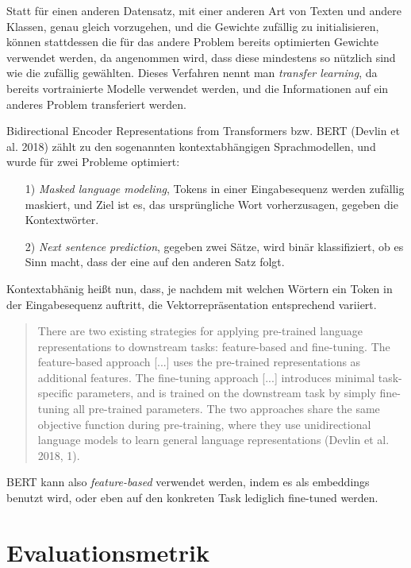 Statt für einen anderen Datensatz, mit einer anderen Art von Texten und andere Klassen, genau gleich vorzugehen, und die Gewichte zufällig zu initialisieren, können stattdessen die für das andere Problem bereits optimierten Gewichte verwendet werden, da angenommen wird, dass diese mindestens so nützlich sind wie die zufällig gewählten. Dieses Verfahren nennt man \textit{transfer learning}, da bereits vortrainierte Modelle verwendet werden, und die Informationen auf ein anderes Problem transferiert werden.

Bidirectional Encoder Representations from Transformers bzw. BERT (Devlin et al. 2018) zählt zu den sogenannten kontextabhängigen Sprachmodellen, und wurde für zwei Probleme optimiert:

\begin{itemize}
  \item[1) ] \textit{Masked language modeling}, Tokens in einer Eingabesequenz werden zufällig maskiert, und Ziel ist es, das ursprüngliche Wort vorherzusagen, gegeben die Kontextwörter.
  \item[2) ] \textit{Next sentence prediction}, gegeben zwei Sätze, wird binär klassifiziert, ob es Sinn macht, dass der eine auf den anderen Satz folgt.
\end{itemize}

Kontextabhänig heißt nun, dass, je nachdem mit welchen Wörtern ein Token in der Eingabesequenz auftritt, die Vektorrepräsentation entsprechend variiert.

\begin{quote}
There are two existing strategies for applying pre-trained language representations to downstream tasks: feature-based and fine-tuning. The feature-based approach [...] uses the pre-trained representations as additional features. The fine-tuning approach [...] introduces minimal task-specific parameters, and is trained on the downstream task by simply fine-tuning all pre-trained parameters. The two approaches share the same objective function during pre-training, where they use unidirectional language models to learn general language representations (Devlin et al. 2018, 1).
\end{quote}

BERT kann also \textit{feature-based} verwendet werden, indem es als embeddings benutzt wird, oder eben auf den konkreten Task lediglich fine-tuned werden.

\section{Evaluationsmetrik}
\label{evaluation}

